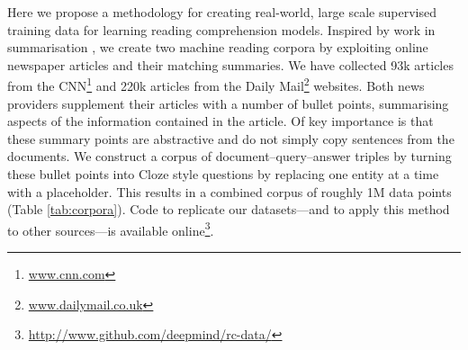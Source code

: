 \documentclass{article}
\begin{document}
Here we propose a methodology for creating real-world, large scale supervised
training data for learning reading comprehension models. Inspired by work in
summarisation \cite{Svore:2007:CNN,Woodsend:2010:CNN}, we create two machine
reading corpora by exploiting online newspaper articles and their matching
summaries. We have collected 93k articles from the CNN\footnote{\url{www.cnn.com}} and 220k articles from
the Daily Mail\footnote{\url{www.dailymail.co.uk}} websites. Both news providers supplement their articles with a
number of bullet points, summarising aspects of the information contained in the
article. Of key importance is that these summary points are abstractive and do
not simply copy sentences from the documents.
We construct a corpus of document--query--answer triples by turning these
bullet points into Cloze \cite{Taylor:1953:CLOZE} style questions by replacing
one entity at a time with a placeholder. This results in a combined corpus of
roughly 1M data points (Table \ref{tab:corpora}).
Code to replicate our datasets---and to apply this method to other sources---is
available online\footnote{\url{http://www.github.com/deepmind/rc-data/}}.
\end{document}
